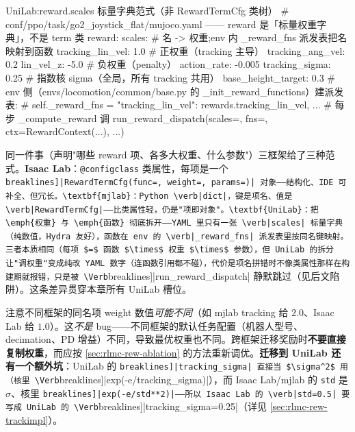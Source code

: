 \begin{codebox}[Python]{UniLab:reward.scales 标量字典范式（非 RewardTermCfg 类树）}
# conf/ppo/task/go2_joystick_flat/mujoco.yaml —— reward 是「标量权重字典」，不是 term 类
reward:
  scales:                            # 名 -> 权重;env 内 _reward_fns 派发表把名映射到函数
    tracking_lin_vel: 1.0            # 正权重（tracking 主导）
    tracking_ang_vel: 0.2
    lin_vel_z: -5.0                  # 负权重（penalty）
    action_rate: -0.005
  tracking_sigma: 0.25               # 指数核 sigma（全局，所有 tracking 共用）
  base_height_target: 0.3
# env 侧（envs/locomotion/common/base.py 的 _init_reward_functions）建派发表:
#   self._reward_fns = {"tracking_lin_vel": rewards.tracking_lin_vel, ...}
# 每步 _compute_reward 调 run_reward_dispatch(scales=, fns=, ctx=RewardContext(...), ...)
\end{codebox}

\begin{insight}\label{ins:rlmc-rew-threeparadigm}
同一件事（声明"哪些 reward 项、各多大权重、什么参数"）三框架给了三种范式。\textbf{Isaac Lab}：\verb|@configclass| 类属性，每项是一个 \Verb[breaklines]|RewardTermCfg(func=, weight=, params=)| 对象——结构化、IDE 可补全、但冗长。\textbf{mjlab}：Python \verb|dict|，键是项名、值是 \verb|RewardTermCfg|——比类属性轻，仍是"项即对象"。\textbf{UniLab}：把 \emph{权重} 与 \emph{函数} 彻底拆开——YAML 里只有一张 \verb|scales| 标量字典（纯数值，Hydra 友好），函数在 env 的 \verb|_reward_fns| 派发表里按同名键映射。三者本质相同（每项 $=$ 函数 $\times$ 权重 $\times$ 参数），但 UniLab 的拆分让"调权重"变成纯改 YAML 数字（连函数引用都不碰），代价是项名拼错时不像类属性那样在构建期就报错，只是被 \Verb[breaklines]|run_reward_dispatch| 静默跳过（见后文陷阱）。这条差异贯穿本章所有 UniLab 槽位。
\end{insight}

\begin{pitfall}
注意不同框架的同名项 weight 数值\emph{可能不同}（如 mjlab tracking 给 $2.0$、Isaac Lab 给 $1.0$）。这\emph{不是} bug——不同框架的默认任务配置（机器人型号、decimation、PD 增益）不同，导致最优权重也不同。跨框架迁移奖励时\textbf{不要直接复制权重}，而应按 \cref{sec:rlmc-rew-ablation} 的方法重新调优。\textbf{迁移到 UniLab 还有一个额外坑}：UniLab 的 \Verb[breaklines]|tracking_sigma| 直接当 $\sigma^2$ 用（核里 \Verb[breaklines]|exp(-e/tracking_sigma)|），而 Isaac Lab/mjlab 的 \verb|std| 是 $\sigma$、核里 \Verb[breaklines]|exp(-e/std**2)|——所以 Isaac Lab 的 \verb|std=0.5| 要写成 UniLab 的 \Verb[breaklines]|tracking_sigma=0.25|（详见 \cref{sec:rlmc-rew-trackimpl}）。
\end{pitfall}

